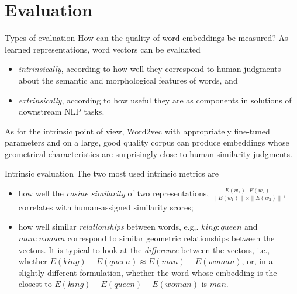\documentclass[style=upen, size=14pt]{powerdot}
\newcommand{\gold}{\color{arany}}
\theoremstyle{definition}
\begin{document}
\section{Evaluation}

\begin{slide}[toc=Evaluation types]{Types of evaluation}
  How can the quality of word embeddings be measured? As learned
  representations, word vectors can be evaluated
  \begin{itemize}
  \item \emph{\gold intrinsically}, according to how well they correspond to
    human judgments about the semantic and morphological features of words, and
  \item \emph{\gold extrinsically}, according to how useful they are as
    components in solutions of downstream NLP tasks.
  \end{itemize}
  As for the intrinsic point of view, Word2vec with appropriately fine-tuned
  parameters and on a large, good quality corpus can produce embeddings whose
  geometrical characteristics are surprisingly close to human similarity
  judgments.
\end{slide}

\begin{slide}[toc=Intrinsic]{Intrinsic evaluation}
  The two most used intrinsic metrics are
  \begin{itemize}
  \item how well the \emph{\gold cosine similarity} of two representations,
    $\frac{E(w_1)\cdot E(w_2)}{\|E(w_1)\|\times \|E(w_2)\|} $, correlates with
    human-assigned similarity scores;
  \item how well similar \emph{\gold relationships} between words, e.g,.
    $king:queen$ and $man:woman$ correspond to similar geometric relationships
    between the vectors. It is typical to look at the \emph{difference} between
    the vectors, i.e., whether $E(king)-E(queen)\approx E(man)-E(woman)$, or, in
    a slightly different formulation, whether the word whose embedding is the
    closest to $E(king)-E(queen) + E(woman)$ is $man$.
  \end{itemize}
\end{slide}
\end{document}

